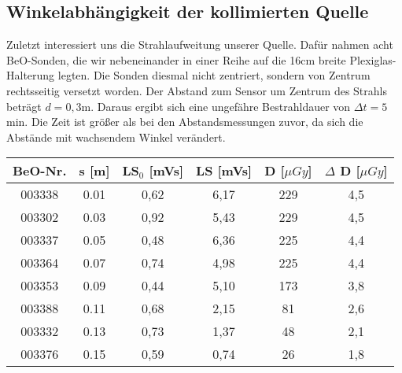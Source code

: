 \subsection{Winkelabhängigkeit der kollimierten Quelle}

Zuletzt interessiert uns die Strahlaufweitung unserer Quelle. Dafür nahmen acht BeO-Sonden, die wir nebeneinander in einer Reihe auf die 16cm breite Plexiglas-Halterung legten. Die Sonden diesmal nicht zentriert, sondern von Zentrum rechtsseitig versetzt worden. Der Abstand zum Sensor um Zentrum des Strahls beträgt $d = 0,3$m. Daraus ergibt sich eine ungefähre Bestrahldauer von $\Delta t = 5$min. Die Zeit ist größer als bei den Abstandsmessungen zuvor, da sich die Abstände mit wachsendem Winkel verändert.

\vspace{5mm}
\minipanf
	\begin{center}
		\begin{tabular}{c|c|c|c|c|c}
				\textbf{BeO-Nr.}& \textbf{s} [m] & \textbf{LS$_0$} [mVs] & \textbf{LS} [mVs] & \textbf{D} [$\mu Gy$] & $\Delta$ \textbf{D} [$\mu Gy$] \\
		 \hline 003338 &  0.01 & 0,62 & 6,17 & 229 & 4,5 \\
				003302 &  0.03 & 0,92 & 5,43 & 229 & 4,5 \\
				003337 &  0.05 & 0,48 & 6,36 & 225 & 4,4 \\
				003364 &  0.07 & 0,74 & 4,98 & 225 & 4,4 \\
				003353 &  0.09 & 0,44 & 5,10 & 173 & 3,8 \\
				003388 & 0.11	& 0,68 & 2,15 & 81 & 2,6 \\
				003332 & 0.13 & 0,73 & 1,37 & 48 & 2,1 \\
				003376 & 0.15 & 0,59 & 0,74 & 26 & 1,8 \\
		\end{tabular}
        \label{dft:Aufweitung}
	\end{center} 
\minipend
\vspace{5mm}
